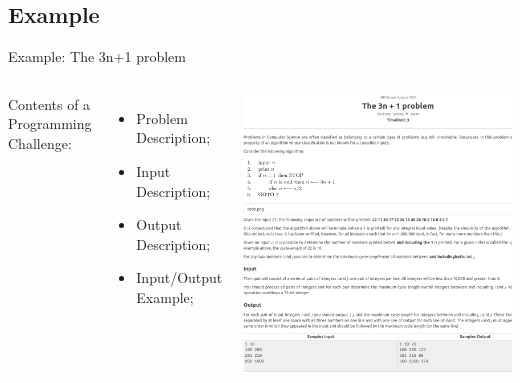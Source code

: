 \subsection{Example}
\begin{frame}{Example: The 3n+1 problem}
  \begin{columns}
      Contents of a Programming Challenge:
      \begin{itemize}
        \item Problem Description;
        \item Input Description;
        \item Output Description;
        \item Input/Output Example;
      \end{itemize}

    \includegraphics[width=1\textwidth]{img/3n_problem_label}
  \end{columns}
\end{frame}

